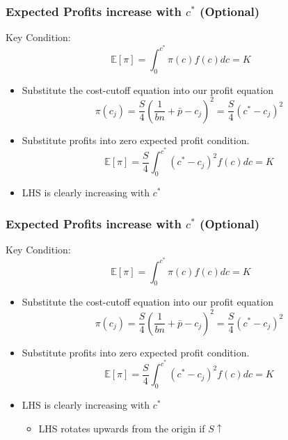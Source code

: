 \documentclass{beamer}
\begin{document}
\begin{frame}[label=Formal]
	\frametitle{Expected Profits increase with $c^*$ (Optional)}
Key Condition:
\begin{equation}
\mathbb{E}\left[\pi \right] = \int_0^{c^*}\pi(c)f(c)dc=K  \nonumber 
\end{equation}	
\begin{itemize}
	\item Substitute the cost-cutoff equation into our profit equation
	\begin{equation}
	\pi(c_j)=\frac{S}{4}\left(\frac{1}{bn}+\bar{p} -c_j \right)^2 =  \frac{S}{4}\left(c^*-c_j \right)^2 \nonumber
	\end{equation}
	\item Substitute profits into zero expected profit condition.
	\begin{equation}
	\mathbb{E}\left[\pi \right] = \frac{S}{4}\int_0^{c^*}\left(c^*-c_j \right)^2 f(c)dc=K  \nonumber 
	\end{equation}
	\item LHS is clearly increasing with $c^*$

\end{itemize}
	
	\hyperlink{cost}{}
\end{frame}


\begin{frame}[label=Formal2]
	\frametitle{Expected Profits increase with $c^*$ (Optional)}
	Key Condition:
	\begin{equation}
	\mathbb{E}\left[\pi \right] = \int_0^{c^*}\pi(c)f(c)dc=K  \nonumber 
	\end{equation}	
	\begin{itemize}
		\item Substitute the cost-cutoff equation into our profit equation
		\begin{equation}
		\pi(c_j)=\frac{S}{4}\left(\frac{1}{bn}+\bar{p} -c_j \right)^2 =  \frac{S}{4}\left(c^*-c_j \right)^2 \nonumber
		\end{equation}
		\item Substitute profits into zero expected profit condition.
		\begin{equation}
		\mathbb{E}\left[\pi \right] = \frac{S}{4}\int_0^{c^*}\left(c^*-c_j \right)^2 f(c)dc=K  \nonumber 
		\end{equation}
		\item LHS is clearly increasing with $c^*$
		\begin{itemize}
			\item LHS rotates upwards from the origin if $S\uparrow $
		\end{itemize}
		
	\end{itemize}
	
	\hyperlink{cost2}{}
\end{frame}
\end{document}
